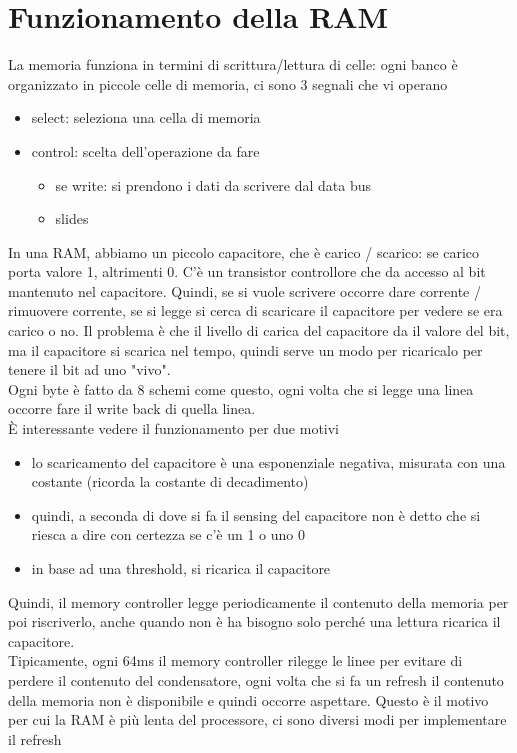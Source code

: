\documentclass[12pt, oneside]{extbook} %
\begin{document}
\section{Funzionamento della RAM}
La memoria funziona in termini di scrittura/lettura di celle: ogni banco è organizzato in piccole celle di memoria, ci sono 3 segnali che vi operano
\begin{itemize}
\item select: seleziona una cella di memoria
\item control: scelta dell'operazione da fare
\begin{itemize}
\item se write: si prendono i dati da scrivere dal data bus
\item slides
\end{itemize}
\end{itemize}
In una RAM, abbiamo un piccolo capacitore, che è carico / scarico: se carico porta valore 1, altrimenti 0. C'è un transistor controllore che da accesso al bit mantenuto nel capacitore. Quindi, se si vuole scrivere occorre dare corrente / rimuovere corrente, se si legge si cerca di scaricare il capacitore per vedere se era carico o no. Il problema è che il livello di carica del capacitore da il valore del bit, ma il capacitore si scarica nel tempo, quindi serve un modo per ricaricalo per tenere il bit ad uno "vivo".\\ Ogni byte è fatto da 8 schemi come questo, ogni volta che si legge una linea occorre fare il write back di quella linea.\\ È interessante vedere il funzionamento per due motivi
\begin{itemize}
\item lo scaricamento del capacitore è una esponenziale negativa, misurata con una costante (ricorda la costante di decadimento)
\item quindi, a seconda di dove si fa il sensing del capacitore non è detto che si riesca a dire con certezza se c'è un 1 o uno 0
\item in base ad una threshold, si ricarica il capacitore
\end{itemize}
Quindi, il memory controller legge periodicamente il contenuto della memoria per poi riscriverlo, anche quando non è ha bisogno solo perché una lettura ricarica il capacitore.\\Tipicamente, ogni 64ms il memory controller rilegge le linee per evitare di perdere il contenuto del condensatore, ogni volta che si fa un refresh il contenuto della memoria non è disponibile e quindi occorre aspettare. Questo è il motivo per cui la RAM è più lenta del processore, ci sono diversi modi per implementare il refresh
\end{document}
